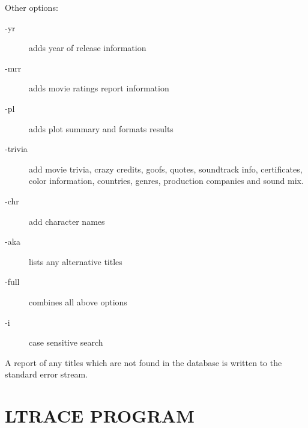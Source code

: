 Other options:
\begin{description}
\item[-yr]   adds year of release information
\item[-mrr]  adds movie ratings report information
\item[-pl]   adds plot summary and formats results
\item[-trivia] add movie trivia, crazy credits, goofs, quotes, soundtrack 
info, certificates, color information, countries, genres, production 
companies and sound mix.
\item[-chr]  add character names
\item[-aka]  lists any alternative titles
\item[-full] combines all above options
\item[-i]    case sensitive search
\end{description}

A report of any titles which are not found in the database is written to 
the
standard error stream. 

\clearpage
\section{LTRACE PROGRAM}

